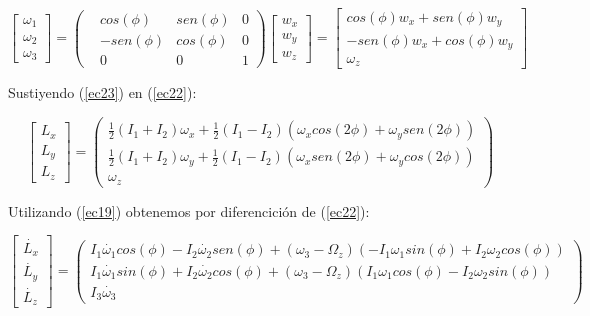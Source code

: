 		\begin{equation}
		\begin{bmatrix}
  		{\omega_{1}}\\
  		{\omega_{2}}\\
  		{\omega_{3}}
  		\end{bmatrix} =
 		\begin{pmatrix}
        & cos(\phi) & sen(\phi) & 0 \\
        & -sen(\phi) &  cos(\phi) & 0 \\
        & 0       &  0       & 1
		\end{pmatrix}
    	\begin{bmatrix}
  		w_{x}\\
  		w_{y}\\
  		w_{z}
  		\end{bmatrix}
  		=
    	\begin{bmatrix}
  		cos(\phi) w_{x} + sen(\phi) w_{y}\\
   		-sen(\phi) w_{x} + cos(\phi) w_{y}\\
  		\omega_{z}
  		\end{bmatrix}
		\label{ec23}
		\end{equation} %

	Sustiyendo (\ref{ec23}) en (\ref{ec22}):

    	\begin{equation}
		\begin{bmatrix}
  		{L_{x}}\\
  		{L_{y}}\\
  		{L_{z}}
  		\end{bmatrix} =
 		\begin{pmatrix}
        \frac{1}{2}(I_{1}+I_{2})\omega_{x} + \frac{1}{2}(I_{1}-I_{2})(\omega_{x}cos(2\phi)+\omega_{y}sen(2\phi)) \\
        \frac{1}{2}(I_{1}+I_{2})\omega_{y} + \frac{1}{2}(I_{1}-I_{2})(\omega_{x}sen(2\phi)+\omega_{y}cos(2\phi)) \\
        \omega_{z}
		\end{pmatrix}
		\label{ec24}
		\end{equation} %

	Utilizando (\ref{ec19}) obtenemos por diferencición de (\ref{ec22}):

		\begin{equation}
		\begin{bmatrix}
	  	\dot{L_{x}}\\
  		\dot{L_{y}}\\
  		\dot{L_{z}}
  		\end{bmatrix} =
 		\begin{pmatrix}
 		I_{1}\dot{\omega_{1}}cos(\phi)-I_{2}\dot{\omega_{2}}sen(\phi)+(\omega_{3}-\Omega_{z})(-I_{1}\omega_{1}sin(\phi)+I_{2}\omega_{2}cos(\phi))\\
   		I_{1}\dot{\omega_{1}}sin(\phi)+I_{2}\dot{\omega_{2}}cos(\phi)+(\omega_{3}-\Omega_{z})(I_{1}\omega_{1}cos(\phi)-I_{2}\omega_{2}sin(\phi))\\
        I_{3}\dot{\omega_{3}}
		\end{pmatrix}
		\label{ec25}
		\end{equation} %

